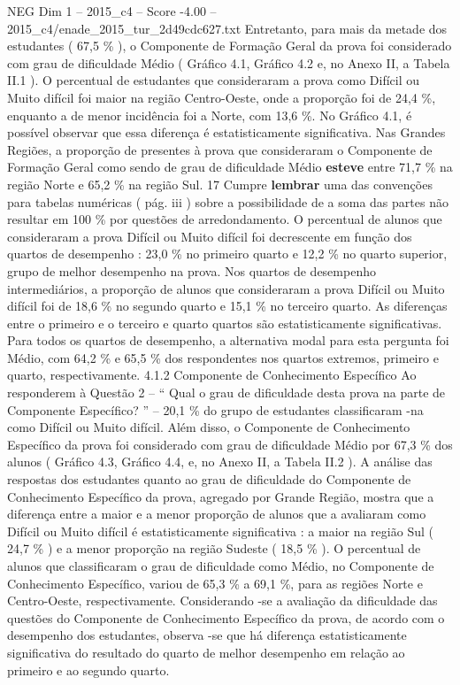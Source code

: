\begin{textsample}{NEG Dim 1 – 2015\_c4 – Score -4.00 – 2015\_c4/enade\_2015\_tur\_2d49cdc627.txt}
Entretanto, para mais da metade dos estudantes ( 67,5 \% ), o Componente de Formação Geral da prova foi considerado com grau de dificuldade Médio ( Gráfico 4.1, Gráfico 4.2 e, no Anexo II, a Tabela II.1 ).
O percentual de estudantes que consideraram a prova como Difícil ou Muito difícil foi maior na região Centro-Oeste, onde a proporção foi de 24,4 \%, enquanto a de menor incidência foi a Norte, com 13,6 \%.
No Gráfico 4.1, é possível observar que essa diferença é estatisticamente significativa.
Nas Grandes Regiões, a proporção de presentes à prova que consideraram o Componente de Formação Geral como sendo de grau de dificuldade Médio \textbf{esteve} entre 71,7 \% na região Norte e 65,2 \% na região Sul. 17 Cumpre \textbf{lembrar} uma das convenções para tabelas numéricas ( pág. iii ) sobre a possibilidade de a soma das partes não resultar em 100 \% por questões de arredondamento.
O percentual de alunos que consideraram a prova Difícil ou Muito difícil foi decrescente em função dos quartos de desempenho : 23,0 \% no primeiro quarto e 12,2 \% no quarto superior, grupo de melhor desempenho na prova.
Nos quartos de desempenho intermediários, a proporção de alunos que consideraram a prova Difícil ou Muito difícil foi de 18,6 \% no segundo quarto e 15,1 \% no terceiro quarto.
As diferenças entre o primeiro e o terceiro e quarto quartos são estatisticamente significativas.
Para todos os quartos de desempenho, a alternativa modal para esta pergunta foi Médio, com 64,2 \% e 65,5 \% dos respondentes nos quartos extremos, primeiro e quarto, respectivamente. 4.1.2 Componente de Conhecimento Específico Ao responderem à Questão 2 – “ Qual o grau de dificuldade desta prova na parte de Componente Específico? ” – 20,1 \% do grupo de estudantes classificaram -na como Difícil ou Muito difícil.
Além disso, o Componente de Conhecimento Específico da prova foi considerado com grau de dificuldade Médio por 67,3 \% dos alunos ( Gráfico 4.3, Gráfico 4.4, e, no Anexo II, a Tabela II.2 ).
A análise das respostas dos estudantes quanto ao grau de dificuldade do Componente de Conhecimento Específico da prova, agregado por Grande Região, mostra que a diferença entre a maior e a menor proporção de alunos que a avaliaram como Difícil ou Muito difícil é estatisticamente significativa : a maior na região Sul ( 24,7 \% ) e a menor proporção na região Sudeste ( 18,5 \% ).
O percentual de alunos que classificaram o grau de dificuldade como Médio, no Componente de Conhecimento Específico, variou de 65,3 \% a 69,1 \%, para as regiões Norte e Centro-Oeste, respectivamente.
Considerando -se a avaliação da dificuldade das questões do Componente de Conhecimento Específico da prova, de acordo com o desempenho dos estudantes, observa -se que há diferença estatisticamente significativa do resultado do quarto de melhor desempenho em relação ao primeiro e ao segundo quarto.

\end{textsample}
